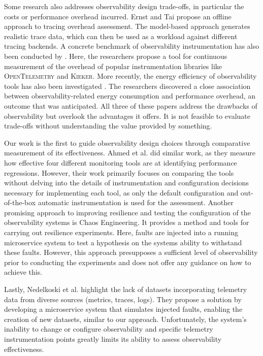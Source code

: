 Some research also addresses observability design trade-offs, in particular the costs or performance overhead incurred. Ernst and Tai \cite{Ernst_OfflineTraceGeneration_2021} propose an offline approach to tracing overhead assessment. The model-based approach generates realistic trace data, which can then be used as a workload against different tracing backends. A concrete benchmark of observability instrumentation has also been conducted by \cite{Reichelt_OverheadOpenTelemetryEtc}. Here, the researchers propose a tool for continuous measurement of the overhead of popular instrumentation libraries like \textsc{OpenTelemetry} and \textsc{Kieker}. More recently, the energy efficiency of observability tools has also been investigated \cite{Dinga_EnergyEfficiencyOfMonitoring_2023}. The researchers discovered a close association between observability-related energy consumption and performance overhead, an outcome that was anticipated.
All three of these papers address the drawbacks of observability but overlook the advantages it offers. It is not feasible to evaluate trade-offs without understanding the value provided by something.

Our work is the first to guide observability design choices through comparative measurement of its effectiveness. Ahmed et al. \cite{Ahmed_EffectivenessOfAPM_2016} did similar work, as they measure how effective four different monitoring tools are at identifying performance regressions.  However, their work primarily focuses on comparing the tools without delving into the details of instrumentation and configuration decisions necessary for implementing each tool, as only the default configuration and out-of-the-box automatic instrumentation is used for the assessment.
Another promising approach to improving resilience and testing the configuration of the observability systems is Chaos Engineering. It provides a method  \cite{Basiri_ChaosEngineeringPrinciples_2016} and tools \cite{Heorhiadi_GremlinChaosEngineering_2016,Meiklejohn_FillibusterChaosEngineering_2021,Simonsson_ChaosOrca_2021,Zhang_PhoebeChaosEngineering_2022,Zhang_PhoebeChaosEngineering_2022} for carrying out resilience experiments. Here, faults are injected into a running microservice system to test a hypothesis on the systems ability to withstand these faults. 
However, this approach presupposes a sufficient level of observability prior to conducting the experiments and does not offer any guidance on how to achieve this.

Lastly, Nedelkoski et al. \cite{Nedelkoski_MultiSourceSyntheticData_2020} highlight the lack of datasets incorporating telemetry data from diverse sources (metrics, traces, logs). They propose a solution by developing a microservice system that simulates injected faults, enabling the creation of new datasets, similar to our approach. 
Unfortunately, the system's inability to change or configure observability and specific telemetry instrumentation points greatly limits its ability to assess observability effectiveness.
